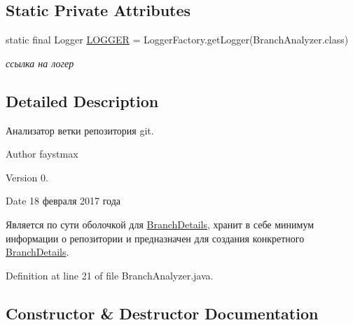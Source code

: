 \subsection*{Static Private Attributes}
\begin{DoxyCompactItemize}
\item 
static final Logger \hyperlink{classcom_1_1selesse_1_1gitwrapper_1_1analyzer_1_1_branch_analyzer_acd19adc9de1c16cf04f119fb913291cf}{L\+O\+G\+G\+ER} = Logger\+Factory.\+get\+Logger(Branch\+Analyzer.\+class)
\begin{DoxyCompactList}\small\item\em ссылка на логер \end{DoxyCompactList}\end{DoxyCompactItemize}


\subsection{Detailed Description}
Анализатор ветки репозитория git. 

\begin{DoxyAuthor}{Author}
faystmax 
\end{DoxyAuthor}
\begin{DoxyVersion}{Version}
0. 
\end{DoxyVersion}
\begin{DoxyDate}{Date}
18 февраля 2017 года
\end{DoxyDate}
Является по сути оболочкой для \hyperlink{classcom_1_1selesse_1_1gitwrapper_1_1analyzer_1_1_branch_details}{Branch\+Details}, хранит в себе минимум информации о репозитории и предназначен для создания конкретного \hyperlink{classcom_1_1selesse_1_1gitwrapper_1_1analyzer_1_1_branch_details}{Branch\+Details}. 

Definition at line 21 of file Branch\+Analyzer.\+java.



\subsection{Constructor \& Destructor Documentation}
\mbox{\label{classcom_1_1selesse_1_1gitwrapper_1_1analyzer_1_1_branch_analyzer_a957c34c5a1aaf045a409e23f468ad7bd}} 
